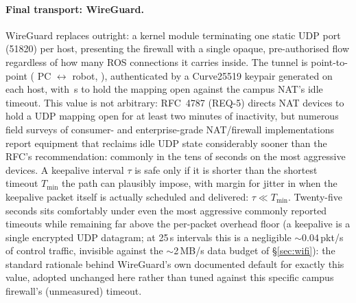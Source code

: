 \paragraph{Final transport: WireGuard.} WireGuard replaces 
outright: a kernel module terminating one static UDP port (\num{51820}) per
host, presenting the firewall with a single opaque, pre-authorised flow
regardless of how many ROS connections it carries inside. The tunnel is
point-to-point ( PC $\leftrightarrow$ 
robot, ), authenticated by a Curve25519 keypair generated on each
host, with \,s to hold the mapping open against
the campus NAT's idle timeout. This value is not arbitrary: RFC~4787
(REQ-5) directs NAT devices to hold a UDP mapping open for at least two
minutes of inactivity, but numerous field surveys of consumer- and
enterprise-grade NAT/firewall implementations report equipment that
reclaims idle UDP state considerably sooner than the RFC's recommendation:
commonly in the tens of seconds on the most aggressive devices. A
keepalive interval $\tau$ is safe only if it is shorter than the shortest
timeout $T_{\min}$ the path can plausibly impose, with margin for jitter in
when the keepalive packet itself is actually scheduled and delivered:
$\tau \ll T_{\min}$. Twenty-five seconds sits comfortably under even the
most aggressive commonly reported timeouts while remaining far above the
per-packet overhead floor (a keepalive is a single encrypted UDP datagram;
at 25\,s intervals this is a negligible $\sim$0.04\,pkt/s of control
traffic, invisible against the $\sim$2\,MB/s data budget of
\S\ref{sec:wifi}): the standard rationale behind WireGuard's own
documented default for exactly this value, adopted unchanged here rather
than tuned against this specific campus firewall's (unmeasured) timeout.

